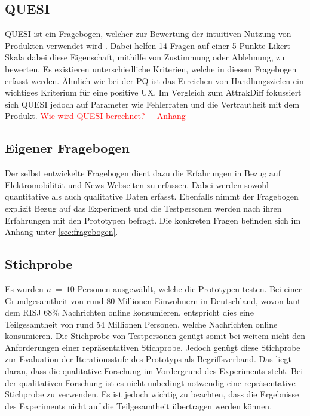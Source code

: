 \subsection{QUESI}
\ac{QUESI} ist ein Fragebogen, welcher zur Bewertung der intuitiven Nutzung von Produkten verwendet wird \cite{quesi-benchmarks, quesi-short}.
Dabei helfen 14 Fragen auf einer 5-Punkte Likert-Skala dabei diese Eigenschaft, mithilfe von Zustimmung oder Ablehnung, zu bewerten.
Es existieren unterschiedliche Kriterien, welche in diesem Fragebogen erfasst werden.
Ähnlich wie bei der \ac{PQ} ist das Erreichen von Handlungszielen ein wichtiges Kriterium für eine positive \ac{UX}.
Im Vergleich zum AttrakDiff fokussiert sich \ac{QUESI} jedoch auf Parameter wie Fehlerraten und die Vertrautheit mit dem Produkt.
\textcolor{red}{Wie wird QUESI berechnet? + Anhang}

\subsection{Eigener Fragebogen}
Der selbst entwickelte Fragebogen dient dazu die Erfahrungen in Bezug auf Elektromobilität und News-Webseiten zu erfassen.
Dabei werden sowohl quantitative als auch qualitative Daten erfasst.
Ebenfalls nimmt der Fragebogen explizit Bezug auf das Experiment und die Testpersonen werden nach ihren Erfahrungen mit den Prototypen befragt.
Die konkreten Fragen befinden sich im Anhang unter \autoref{sec:fragebogen}.

\subsection{Stichprobe}
Es wurden $n\ =\ 10$ Personen ausgewählt, welche die Prototypen testen.
Bei einer Grundgesamtheit von rund 80 Millionen Einwohnern in Deutschland, wovon laut dem \ac{RISJ} $68\%$ Nachrichten online konsumieren, entspricht dies eine Teilgesamtheit von rund 54 Millionen Personen, welche Nachrichten online konsumieren.
Die Stichprobe von Testpersonen genügt somit bei weitem nicht den Anforderungen einer repräsentativen Stichprobe.
Jedoch genügt diese Stichprobe zur Evaluation der Iterationsstufe des Prototyps als Begriffsverband.
Das liegt daran, dass die qualitative Forschung im Vordergrund des Experiments steht.
Bei der qualitativen Forschung ist es nicht unbedingt notwendig eine repräsentative Stichprobe zu verwenden.
Es ist jedoch wichtig zu beachten, dass die Ergebnisse des Experiments nicht auf die Teilgesamtheit übertragen werden können.\\


